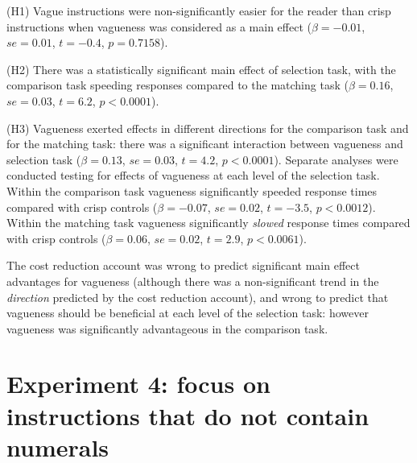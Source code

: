 \documentclass[%
man,		%
floatsintext,%
apacite%
]{apa6}
\begin{document}
\begin{APAenumerate}
	\item [(H1)] Vague instructions were non-significantly easier for the reader than crisp instructions when vagueness was considered as a main effect ($\beta=-0.01$, $se=0.01$, $t=-0.4$, $p=0.7158$). 
	\item [(H2)] There was a statistically significant main effect of selection task, with the comparison task speeding responses compared to the matching task ($\beta=0.16$, $se=0.03$, $t=6.2$, $p<0.0001$). 
	\item [(H3)] Vagueness exerted effects in different directions for the comparison task and for the matching task: there was a significant interaction between vagueness and selection task ($\beta=0.13$, $se=0.03$, $t=4.2$, $p<0.0001$). 
Separate analyses were conducted testing for effects of vagueness at each level of the selection task.
Within the comparison task vagueness significantly speeded response times compared with crisp controls ($\beta=-0.07$, $se=0.02$, $t=-3.5$, $p<0.0012$). 
Within the matching task vagueness significantly \emph{slowed} response times compared with crisp controls ($\beta=0.06$, $se=0.02$, $t=2.9$, $p<0.0061$). 
\end{APAenumerate}

The cost reduction account was wrong to predict significant main effect advantages for vagueness (although there was a non-significant trend in the \emph{direction} predicted by the cost reduction account), and wrong to predict that vagueness should be beneficial at each level of the selection task: however vagueness was significantly advantageous in the comparison task.



\section{Experiment 4: focus on instructions that do not contain numerals} %
\end{document}
